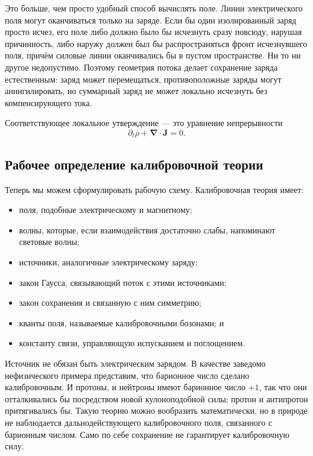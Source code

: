 Это больше, чем просто удобный способ вычислять поле. Линии электрического поля могут оканчиваться только на заряде. Если бы один изолированный заряд просто исчез, его поле либо должно было бы исчезнуть сразу повсюду, нарушая причинность, либо наружу должен был бы распространяться фронт исчезнувшего поля, причём силовые линии оканчивались бы в пустом пространстве. Ни то ни другое недопустимо. Поэтому геометрия потока делает сохранение заряда естественным: заряд может перемещаться, противоположные заряды могут аннигилировать, но суммарный заряд не может локально исчезнуть без компенсирующего тока.

Соответствующее локальное утверждение — это уравнение непрерывности
\begin{equation}
\partial_t\rho+\boldsymbol\nabla\cdot\boldsymbol J=0.
\label{eq:l5-continuity}
\end{equation}

\subsection{Рабочее определение калибровочной теории}

Теперь мы можем сформулировать рабочую схему. Калибровочная теория имеет:
\begin{itemize}
\item поля, подобные электрическому и магнитному;
\item волны, которые, если взаимодействия достаточно слабы, напоминают световые волны;
\item источники, аналогичные электрическому заряду;
\item закон Гаусса, связывающий поток с этими источниками;
\item закон сохранения и связанную с ним симметрию;
\item кванты поля, называемые калибровочными бозонами; и
\item константу связи, управляющую испусканием и поглощением.
\end{itemize}
Источник не обязан быть электрическим зарядом. В качестве заведомо нефизического примера представим, что барионное число сделано калибровочным. И протоны, и нейтроны имеют барионное число \(+1\), так что они отталкивались бы посредством новой кулоноподобной силы; протон и антипротон притягивались бы. Такую теорию можно вообразить математически, но в природе не наблюдается дальнодействующего калибровочного поля, связанного с барионным числом. Само по себе сохранение не гарантирует калибровочную силу.

